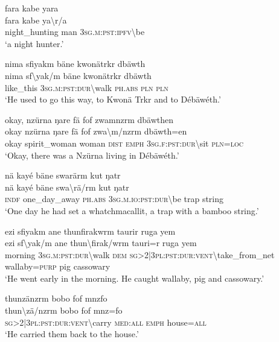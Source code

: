 \ea\label{ex:8:a1662}
fara kabe yara\\
\gll fara	kabe	ya{\textbackslash}r/a\\
     night\_hunting	man	3\textsc{sg}.\textsc{m}:\textsc{pst}:\textsc{ipfv}{\textbackslash}be\\
\glt `a night hunter.'
\z

\ea\label{ex:8:a1663}
nima sfiyakm  bäne kwonätrkr dbäwth\\
\gll nima	sf{\textbackslash}yak/m	bäne	kwonätrkr	dbäwth\\
     like\_this	3\textsc{sg}.\textsc{m}:\textsc{pst}:\textsc{dur}{\textbackslash}walk	\textsc{ph}.\textsc{abs}	\textsc{pln}	\textsc{pln}\\
\glt `He used to go this way, to Kwonä Trkr and to Débäwéth.'
\z

\ea\label{ex:8:a1666}
okay, nzürna ŋare fä fof zwamnzrm dbäwthen\\
\gll okay	nzürna	ŋare	fä	fof	zwa{\textbackslash}m/nzrm	dbäwth=en\\
     okay	spirit\_woman	woman	\textsc{dist}	\textsc{emph}	3\textsc{sg}.\textsc{f}:\textsc{pst}:\textsc{dur}{\textbackslash}sit	\textsc{pln}=\textsc{loc}\\
\glt `Okay, there was a Nzürna living in Débäwéth.'
\z

\ea\label{ex:8:a1668}
nä kayé bäne swarärm kut ŋatr\\
\gll nä	kayé	bäne	swa{\textbackslash}rä/rm	kut	ŋatr\\
     \textsc{indf}	one\_day\_away	\textsc{ph}.\textsc{abs}	3\textsc{sg}.\textsc{m}.\textsc{io}:\textsc{pst}:\textsc{dur}{\textbackslash}be	trap	string\\
\glt `One day he had set a whatchmacallit, a trap with a bamboo string.'
\z

\ea\label{ex:8:a1672}
ezi sfiyakm ane thunfirakwrm taurir ruga yem\\
\gll ezi	sf{\textbackslash}yak/m	ane	thun{\textbackslash}firak/wrm	tauri=r	ruga	yem\\
     morning	3\textsc{sg}.\textsc{m}:\textsc{pst}:\textsc{dur}{\textbackslash}walk	\textsc{dem}	\textsc{sg}>2|3\textsc{pl}:\textsc{pst}:\textsc{dur}:\textsc{vent}{\textbackslash}take\_from\_net	wallaby=\textsc{purp}	pig	cassowary\\
\glt `He went early in the morning. He caught wallaby, pig and cassowary.'
\z

\ea\label{ex:8:a1674}
thunzänzrm bobo fof mnzfo\\
\gll thun{\textbackslash}zä/nzrm	bobo	fof	mnz=fo\\
     \textsc{sg}>2|3\textsc{pl}:\textsc{pst}:\textsc{dur}:\textsc{vent}{\textbackslash}carry	\textsc{med}:\textsc{all}	\textsc{emph}	house=\textsc{all}\\
\glt `He carried them back to the house.'
\z

